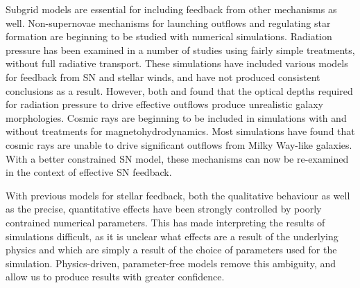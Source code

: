 Subgrid models are essential for including feedback from other mechanisms as
well.  Non-supernovae mechanisms for launching outflows and regulating star
formation are beginning to be studied with numerical simulations.  Radiation
pressure has been examined in a number of studies
\citep{Hopkins2014,Roskar2014,Agertz2015} using fairly simple treatments,
without full radiative transport.  These simulations have included various
models for feedback from SN and stellar winds, and have not produced consistent
conclusions as a result.  However, both \citet{Roskar2014} and
\citet{Agertz2015} found that the optical depths required for radiation pressure
to drive effective outflows produce unrealistic galaxy morphologies.  Cosmic
rays are beginning to be included in simulations with \citep{Girichidis2015} and
without \citep{Jubelgas2008,Booth2013} treatments for magnetohydrodynamics.
Most simulations have found that cosmic rays are unable to drive significant
outflows from Milky Way-like galaxies.  With a better constrained SN model,
these mechanisms can now be re-examined in the context of effective SN feedback.

With previous models for stellar feedback, both the qualitative behaviour as
well as the precise, quantitative effects have been strongly controlled by
poorly contrained numerical parameters.  This has made interpreting the results
of simulations difficult, as it is unclear what effects are a result of
the underlying physics and which are simply a result of the choice of parameters
used for the simulation.  Physics-driven, parameter-free models remove this
ambiguity, and allow us to produce results with greater confidence.  

